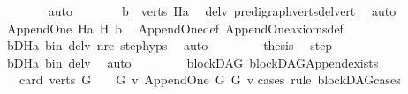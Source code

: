 \begin{isabellebody}
\ \ \ \ \ \ \isamarkupfalse%
\ auto\isanewline
\ \ \ \ \isamarkupfalse%
\ \isamarkupfalse%
\ {\isachardoublequoteopen}b\ {\isasymnotin}\ verts\ Ha{\isachardoublequoteclose}\ \isamarkupfalse%
\ del{\isacharunderscore}{\kern0pt}v\ pre{\isacharunderscore}{\kern0pt}digraph{\isachardot}{\kern0pt}verts{\isacharunderscore}{\kern0pt}del{\isacharunderscore}{\kern0pt}vert\ \isamarkupfalse%
\ auto\isanewline
\ \ \ \ \isamarkupfalse%
\ \isamarkupfalse%
\ {\isachardoublequoteopen}Append{\isacharunderscore}{\kern0pt}One\ Ha\ H\ b{\isachardoublequoteclose}\ \isamarkupfalse%
\ Append{\isacharunderscore}{\kern0pt}One{\isacharunderscore}{\kern0pt}def\ Append{\isacharunderscore}{\kern0pt}One{\isacharunderscore}{\kern0pt}axioms{\isacharunderscore}{\kern0pt}def\ \isanewline
\ \ \ \ \ \ \isamarkupfalse%
\ bD{\isacharunderscore}{\kern0pt}Ha\ b{\isacharunderscore}{\kern0pt}in\ del{\isacharunderscore}{\kern0pt}v\ nre\ step{\isachardot}{\kern0pt}hyps{\isacharparenleft}{\kern0pt}{}{\isacharparenright}{\kern0pt}\ \isamarkupfalse%
\ auto\ \isanewline
\ \ \ \ \isamarkupfalse%
\ \isamarkupfalse%
\ {\isacharquery}{\kern0pt}thesis\ \isamarkupfalse%
\ step\isanewline
\ \ \ \ \ \ \isamarkupfalse%
\ bD{\isacharunderscore}{\kern0pt}Ha\ b{\isacharunderscore}{\kern0pt}in\ del{\isacharunderscore}{\kern0pt}v\ \isamarkupfalse%
\ auto\ \isanewline
\ \ \isamarkupfalse%
\ \ \isanewline
{}\isamarkupfalse%
%
\endisatagproof
{\isafoldproof}%
%
\isadelimproof
\isanewline
%
\endisadelimproof
\isanewline
{}\isamarkupfalse%
\ {\isacharparenleft}{\kern0pt}\ blockDAG{\isacharparenright}{\kern0pt}\ blockDAG{\isacharunderscore}{\kern0pt}Append{\isacharunderscore}{\kern0pt}exists{\isacharcolon}{\kern0pt}\isanewline
\ \ \ {\isachardoublequoteopen}card\ {\isacharparenleft}{\kern0pt}verts\ G{\isacharparenright}{\kern0pt}\ {\isacharequal}{\kern0pt}\ {}\ {\isasymor}\ {\isacharparenleft}{\kern0pt}{\isasymexists}G{}\ v{\isachardot}{\kern0pt}\ Append{\isacharunderscore}{\kern0pt}One\ G{}\ G\ v{\isacharparenright}{\kern0pt}{\isachardoublequoteclose}\isanewline
%
\isadelimproof
%
\endisadelimproof
%
\isatagproof
{}\isamarkupfalse%
{\isacharparenleft}{\kern0pt}cases\ rule{\isacharcolon}{\kern0pt}\ blockDAG{\isacharunderscore}{\kern0pt}cases{}{\isacharparenright}{\kern0pt}\isanewline

\end{isabellebody}
